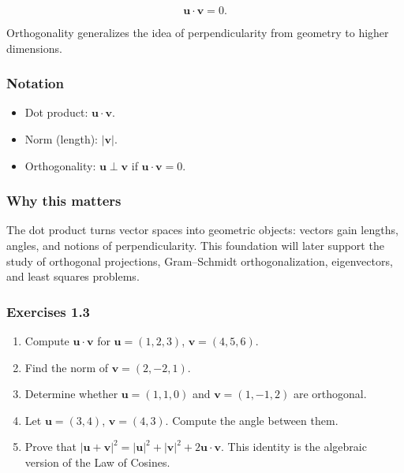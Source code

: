 \documentclass[
  12pt,
  a4paper,
]{article}
\begin{document}
\[\mathbf{u} \cdot \mathbf{v} = 0.\]

Orthogonality generalizes the idea of perpendicularity from geometry to
higher dimensions.

\subsubsection{Notation}\label{notation-3}

\begin{itemize}
\item
  Dot product: \(\mathbf{u} \cdot \mathbf{v}\).
\item
  Norm (length): \(|\mathbf{v}|\).
\item
  Orthogonality: \(\mathbf{u} \perp \mathbf{v}\) if
  \(\mathbf{u} \cdot \mathbf{v} = 0\).
\end{itemize}

\subsubsection{Why this matters}\label{why-this-matters-2}

The dot product turns vector spaces into geometric objects: vectors gain
lengths, angles, and notions of perpendicularity. This foundation will
later support the study of orthogonal projections, Gram--Schmidt
orthogonalization, eigenvectors, and least squares problems.

\subsubsection{Exercises 1.3}\label{exercises-13}

\begin{enumerate}
\def\labelenumi{\arabic{enumi}.}
\item
  Compute \(\mathbf{u} \cdot \mathbf{v}\) for \(\mathbf{u} = (1,2,3)\),
  \(\mathbf{v} = (4,5,6)\).
\item
  Find the norm of \(\mathbf{v} = (2, -2, 1)\).
\item
  Determine whether \(\mathbf{u} = (1,1,0)\) and
  \(\mathbf{v} = (1,-1,2)\) are orthogonal.
\item
  Let \(\mathbf{u} = (3,4)\), \(\mathbf{v} = (4,3)\). Compute the angle
  between them.
\item
  Prove that
  \(|\mathbf{u} + \mathbf{v}|^2 = |\mathbf{u}|^2 + |\mathbf{v}|^2 + 2\mathbf{u}\cdot \mathbf{v}\).
  This identity is the algebraic version of the Law of Cosines.
\end{enumerate}
\end{document}

